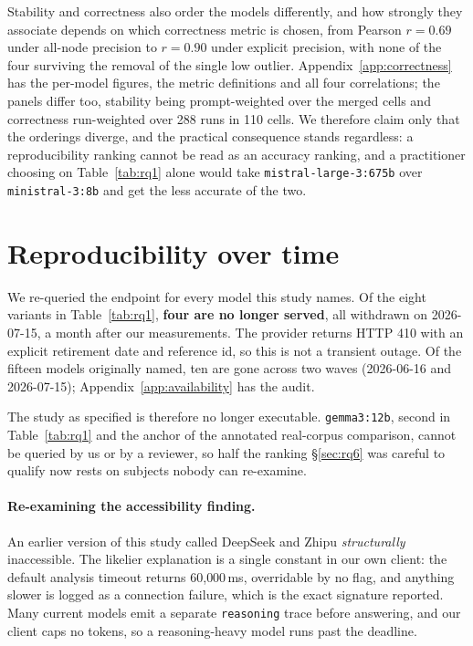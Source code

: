 \documentclass{article}
\begin{document}
Stability and correctness also order the models differently, and how strongly they associate depends on which correctness metric is chosen, from Pearson $r=0.69$ under all-node precision to $r=0.90$ under explicit precision, with none of the four surviving the removal of the single low outlier. Appendix~\ref{app:correctness} has the per-model figures, the metric definitions and all four correlations; the panels differ too, stability being prompt-weighted over the merged cells and correctness run-weighted over 288 runs in 110 cells. We therefore claim only that the orderings diverge, and the practical consequence stands regardless: a reproducibility ranking cannot be read as an accuracy ranking, and a practitioner choosing on Table~\ref{tab:rq1} alone would take \texttt{mistral-large-3:675b} over \texttt{ministral-3:8b} and get the less accurate of the two.

\section{Reproducibility over time}
\label{sec:rq7}


We re-queried the endpoint for every model this study names. Of the eight variants in Table~\ref{tab:rq1}, \textbf{four are no longer served}, all withdrawn on 2026-07-15, a month after our measurements. The provider returns HTTP 410 with an explicit retirement date and reference id, so this is not a transient outage. Of the fifteen models originally named, ten are gone across two waves (2026-06-16 and 2026-07-15); Appendix~\ref{app:availability} has the audit.

The study as specified is therefore no longer executable. \texttt{gemma3:12b}, second in Table~\ref{tab:rq1} and the anchor of the annotated real-corpus comparison, cannot be queried by us or by a reviewer, so half the ranking \S\ref{sec:rq6} was careful to qualify now rests on subjects nobody can re-examine.

\paragraph{Re-examining the accessibility finding.}
An earlier version of this study called DeepSeek and Zhipu \emph{structurally} inaccessible. The likelier explanation is a single constant in our own client: the default analysis timeout returns 60{,}000\,ms, overridable by no flag, and anything slower is logged as a connection failure, which is the exact signature reported. Many current models emit a separate \texttt{reasoning} trace before answering, and our client caps no tokens, so a reasoning-heavy model runs past the deadline.
\end{document}
